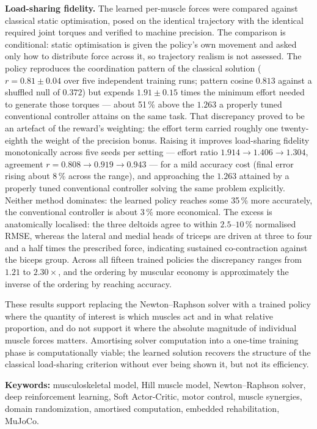 \documentclass[12pt, a4paper]{article}
\begin{document}
\medskip\noindent
\textbf{Load-sharing fidelity.}\;
The learned per-muscle forces were compared against classical static
optimisation, posed on the identical trajectory with the identical required
joint torques and verified to machine precision. The comparison is conditional:
static optimisation is given the policy's own movement and asked only how to
distribute force across it, so trajectory realism is not assessed. The policy reproduces the
coordination pattern of the classical solution ($r = 0.81 \pm 0.04$ over five
independent training runs; pattern cosine $0.813$ against a shuffled null of
$0.372$) but expends $1.91 \pm 0.15$ times the minimum effort needed to generate
those torques --- about 51\,\% above the $1.263$ a properly tuned conventional
controller attains on the same task. That discrepancy proved to be an artefact of the
reward's weighting: the effort term carried roughly one twenty-eighth the weight
of the precision bonus. Raising it improves load-sharing fidelity monotonically
across five seeds per setting --- effort ratio $1.914 \rightarrow 1.406
\rightarrow 1.304$, agreement $r = 0.808 \rightarrow 0.919 \rightarrow 0.943$ ---
for a mild accuracy cost (final error rising about 8\,\% across the range), and
approaching the $1.263$ attained by a properly tuned conventional controller
solving the same problem explicitly.
Neither method dominates: the learned policy reaches some 35\,\% more accurately,
the conventional controller is about 3\,\% more economical. The excess is anatomically localised: the
three deltoids agree to within $2.5$--$10$\,\% normalised RMSE, whereas the
lateral and medial heads of triceps are driven at three to four and a half
times the prescribed force, indicating sustained co-contraction against the
biceps group. Across all fifteen trained policies the discrepancy ranges from
$1.21$ to $2.30\times$, and the ordering by muscular economy is approximately
the inverse of the ordering by reaching accuracy.

\medskip\noindent
These results support replacing the Newton--Raphson solver with a trained
policy where the quantity of interest is which muscles act and in what
relative proportion, and do not support it where the absolute magnitude of
individual muscle forces matters. Amortising solver computation into a
one-time training phase is computationally viable; the learned solution
recovers the structure of the classical load-sharing criterion without ever
being shown it, but not its efficiency.

\bigskip
\noindent\textbf{Keywords:}
musculoskeletal model,
Hill muscle model,
Newton--Raphson solver,
deep reinforcement learning,
Soft Actor-Critic,
motor control,
muscle synergies,
domain randomization,
amortised computation,
embedded rehabilitation,
MuJoCo.

\end{document}
